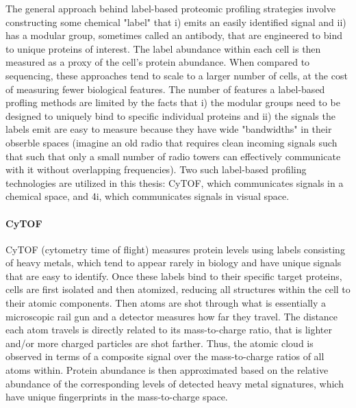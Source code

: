 The general approach behind label-based proteomic profiling strategies involve constructing some chemical "label" that i) emits an easily identified signal and ii) has a modular group, sometimes called an antibody, that are engineered to bind to unique proteins of interest.
The label abundance within each cell is then measured as a proxy of the cell's protein abundance.
When compared to sequencing, these approaches tend to scale to a larger number of cells, at the cost of measuring fewer biological features.
The number of features a label-based profling methods are limited by the facts that i) the modular groups need to be designed to uniquely bind to specific individual proteins and ii) the signals the labels emit are easy to measure because they have wide "bandwidths" in their obserble spaces
(imagine an old radio that requires clean incoming signals such that such that only a small number of radio towers can effectively communicate with it without overlapping frequencies).
Two such label-based profiling technologies are utilized in this thesis:
CyTOF, which communicates signals in a chemical space, and 4i, which communicates signals in visual space.

\paragraph{CyTOF}
CyTOF (cytometry time of flight) %
measures protein levels using labels consisting of heavy metals, which tend to appear rarely in biology and have unique signals that are easy to identify.
Once these labels bind to their specific target proteins, cells are first isolated and then atomized, reducing all structures within the cell to their atomic components.
Then atoms are shot through what is essentially a microscopic rail gun and a detector measures how far they travel.
The distance each atom travels is directly related to its mass-to-charge ratio, that is lighter and/or more charged particles are shot farther.
Thus, the atomic cloud is observed in terms of a composite signal over the mass-to-charge ratios of all atoms within.
Protein abundance is then approximated based on the relative abundance of the corresponding levels of detected heavy metal signatures,
which have unique fingerprints in the mass-to-charge space.

